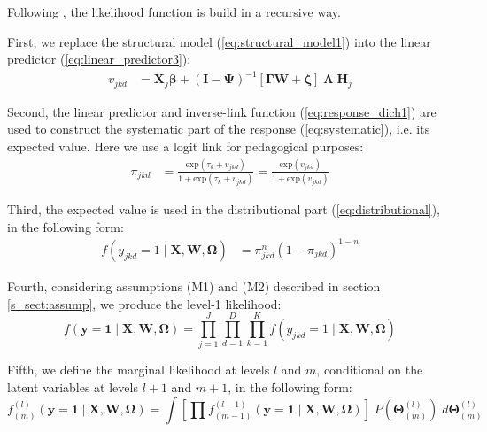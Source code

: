 Following \citet{Rabe_et_al_2004a}, the likelihood function is build in a recursive way. 

\noindent First, we replace the structural model (\ref{eq:structural_model1}) into the linear predictor (\ref{eq:linear_predictor3}):
%
\begin{equation} \label{eq:lin_pred}
	\begin{split}
		v_{jkd} &= \mathbf{X}_{j} \pmb{\beta} + ( \mathbf{I} - \pmb{\Psi} )^{-1} \left[ \pmb{\Gamma} \mathbf{W} + \pmb{\zeta} \right] \; \pmb{\Lambda} \; \mathbf{H}_{j}
	\end{split}
\end{equation}

\noindent Second, the linear predictor and inverse-link function (\ref{eq:response_dich1}) are used to construct the systematic part of the response (\ref{eq:systematic}), i.e. its expected value. Here we use a logit link for pedagogical purposes:
%
\begin{equation} \label{eq:prob}
	\begin{split}
		\pi_{jkd} &= \frac{ \text{exp}(\tau_{k} + v_{jkd}) }{ 1 + \text{exp}(\tau_{k} + v_{jkd}) } = \frac{ \text{exp}(v_{jkd}) }{ 1 + \text{exp}(v_{jkd}) }
	\end{split}	
\end{equation}

\noindent Third, the expected value is used in the distributional part (\ref{eq:distributional}), in the following form:
%
\begin{equation} \label{eq:dist}
	\begin{split}
		f \left( y_{jkd}=1 \; | \; \mathbf{X}, \mathbf{W}, \pmb{\Omega} \right) &= \pi_{jkd}^{n} (1 - \pi_{jkd})^{1-n}
	\end{split}
\end{equation}

\noindent Fourth, considering assumptions (M1) and (M2) described in section \ref{s_sect:assump}, we produce the level-1 likelihood:
%
\begin{equation} \label{eq:lik1}
	f \left( \mathbf{y}=\mathbf{1} \; | \; \mathbf{X}, \mathbf{W}, \pmb{\Omega} \right) = \prod_{j=1}^{J} \prod_{d=1}^{D} \prod_{k=1}^{K} f \left( y_{jkd}=1 \; | \; \mathbf{X}, \mathbf{W}, \pmb{\Omega} \right)
\end{equation}

\noindent Fifth, we define the marginal likelihood at levels $l$ and $m$, conditional on the latent variables at levels $l+1$ and $m+1$, in the following form:
%
\begin{equation} \label{eq:lik2}
	f^{(l)}_{(m)} \left( \mathbf{y}=\mathbf{1} \; | \; \mathbf{X}, \mathbf{W}, \pmb{\Omega} \right) = \int \left[ \prod f^{(l-1)}_{(m-1)} \left( \mathbf{y}=\mathbf{1} \; | \; \mathbf{X}, \mathbf{W}, \pmb{\Omega} \right) \right] \; P( \pmb{\Theta}^{(l)}_{(m)} ) \; d\pmb{\Theta}^{(l)}_{(m)}
\end{equation}

